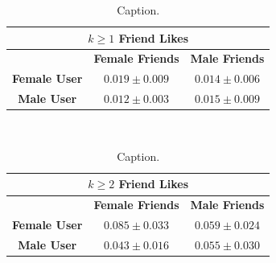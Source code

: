 \begin{table}[t!]
\centering
\begin{tabular}{|c|c|c|} 
\multicolumn{3}{c}{\textbf{$k \geq 1$ Friend Likes}} \\ \hline
& \textbf{Female Friends} & \textbf{Male Friends} \\ \hline
\textbf{Female User} & $0.019 \pm 0.009$ & $0.014 \pm 0.006$ \\ \hline
\textbf{Male User}   & $0.012 \pm 0.003$ & $0.015 \pm 0.009$ \\ \hline
\end{tabular} $\qquad$
\begin{tabular}{|c|c|c|} 
\multicolumn{3}{c}{\textbf{$k \geq 2$ Friend Likes}} \\ \hline
& \textbf{Female Friends} & \textbf{Male Friends} \\ \hline
\textbf{Female User} & $0.085 \pm 0.033$ & $0.059 \pm 0.024$ \\ \hline
\textbf{Male User}   & $0.043 \pm 0.016$ & $0.055 \pm 0.030$ \\ \hline
\end{tabular}
\caption{Caption.}
\label{fig:res6}
\end{table}

